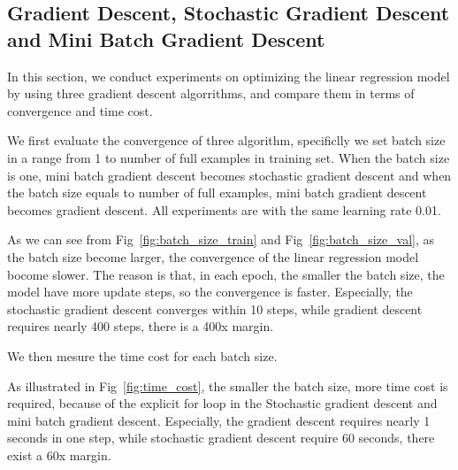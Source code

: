 \documentclass[journal, a4paper]{IEEEtran}
\begin{document}
\subsection{Gradient Descent, Stochastic Gradient Descent and Mini Batch Gradient Descent}
In this section, we conduct experiments on optimizing the linear regression model by using three gradient descent algorrithms, and compare them in terms of convergence and time cost. \par
We first evaluate the convergence of three algorithm, specificlly we set batch size in a range from 1 to number of full examples in training set. When the batch size is one, mini batch gradient descent becomes stochastic gradient descent and when the batch size equals to number of full examples, mini batch gradient descent becomes gradient descent. All experiments are with the same learning rate 0.01.\par
As we can see from Fig~\ref{fig:batch_size_train} and Fig~\ref{fig:batch_size_val}, as the batch size become larger, the convergence of the linear regression model bocome slower. The reason is that, in each epoch, the smaller the batch size, the model have more update steps, so the convergence is faster. Especially, the stochastic gradient descent converges within 10 steps, while gradient descent requires nearly 400 steps, there is a 400x margin.\par
We then mesure the time cost for each batch size. \par 
As illustrated in Fig~\ref{fig:time_cost}, the smaller the batch size, more time cost is required, because of the explicit for loop in the Stochastic gradient descent and mini batch gradient descent. Especially, the gradient descent requires nearly 1 seconds in one step, while stochastic gradient descent require 60 seconds, there exist a 60x margin.  
\end{document}
